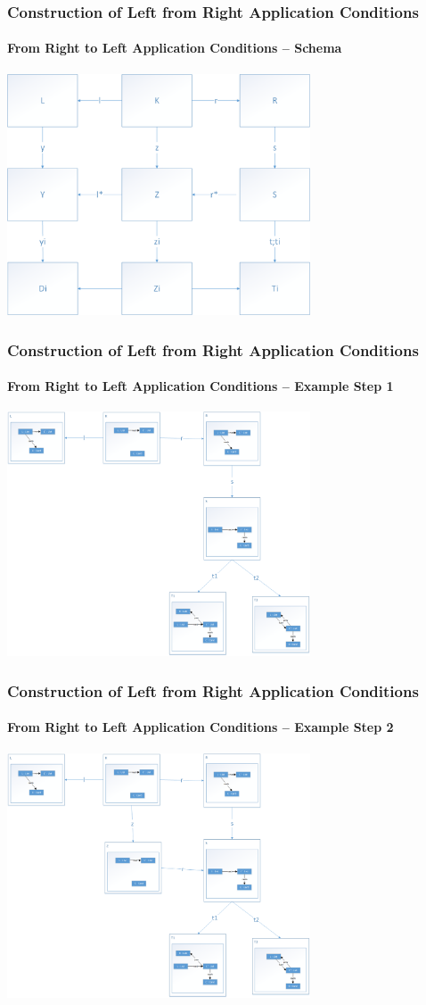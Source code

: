 \documentclass[32pt,t]{beamer}
\begin{document}
	\begin{frame}
		\frametitle{Construction of Left from Right Application Conditions}
		\framesubtitle{From Right to Left Application Conditions -- Schema}
		\centering
		\includegraphics[width=9cm]{Images/50_RightAC-To-LeftAC_Schema}
	\end{frame}

	\begin{frame}
		\frametitle{Construction of Left from Right Application Conditions}
		\framesubtitle{From Right to Left Application Conditions -- Example Step 1}
		\centering
		\includegraphics[width=9cm]{Images/51_RightAC-To-LeftAC_Example_Step1}
	\end{frame}
	
	\begin{frame}
		\frametitle{Construction of Left from Right Application Conditions}
		\framesubtitle{From Right to Left Application Conditions -- Example Step 2}
		\centering
		\includegraphics[width=9cm]{Images/52_RightAC-To-LeftAC_Example_Step2}
	\end{frame}
\end{document}
